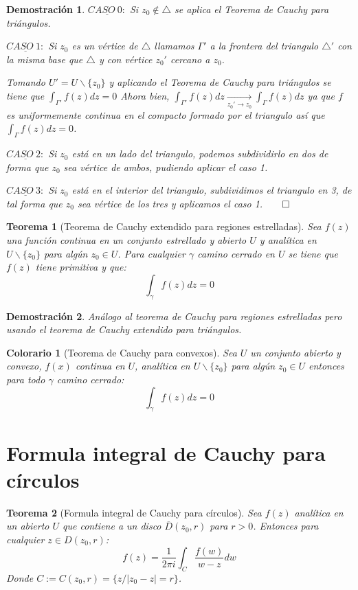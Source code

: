 \documentclass[12pt]{book}
\newtheorem{theorem}{Teorema}[chapter]
\newtheorem*{dem}{Demostración}
\newtheorem{col}{Colorario}[chapter]
\begin{document}
\begin{dem}
$\underline{CASO\ 0:}$
Si $z_0\notin \triangle$ se aplica el Teorema de Cauchy para triángulos.

$\underline{CASO\ 1:}$
Si $z_0$ es un vértice de $\triangle$ llamamos $\Gamma'$ a la frontera del triangulo $\triangle'$ con la misma base que $\triangle$ y con vértice $z_0'$ cercano a $z_0$.

Tomando $U' = U\backslash \{z_0\}$ y aplicando el Teorema de Cauchy para triángulos se tiene que $\int_{\Gamma'} f(z)dz =0$ Ahora bien, $\int_{\Gamma'} f(z)dz \xrightarrow[z_0'\to z_0]{} \int_{\Gamma} f(z)dz$ ya que $f$ es uniformemente continua en el compacto formado por el triangulo así que  $\int_{\Gamma} f(z)dz=0$.

$\underline{CASO\ 2:}$
Si $z_0$ está en un lado del triangulo, podemos subdividirlo en dos de forma que $z_0$ sea vértice de ambos, pudiendo aplicar el caso 1.

$\underline{CASO\ 3:}$
Si $z_0$ está en el interior del triangulo, subdividimos el triangulo en 3, de tal forma que $z_0$ sea vértice de los tres y aplicamos el caso 1.$\qed$
\end{dem}


\begin{theorem}[Teorema de Cauchy extendido para regiones estrelladas]
Sea $f(z)$ una función continua en un conjunto estrellado y abierto $U$ y  analítica en $U\backslash \{z_0\}$ para algún $z_0 \in U$. Para cualquier $\gamma$ camino cerrado en $U$ se tiene que $f(z)$ tiene primitiva y que:
$$
\int_{\gamma} f(z)dz = 0
$$
\end{theorem}
\begin{dem}
Análogo al teorema de Cauchy para regiones estrelladas pero usando el teorema de Cauchy extendido para triángulos.
\end{dem}


\begin{col}[Teorema de Cauchy para convexos]
Sea $U$ un conjunto abierto y convexo, $f(x)$ continua en $U$, analítica en $U\backslash \{z_0\}$ para algún $z_0 \in U$ entonces para todo $\gamma$ camino cerrado:
$$
\int_{\gamma} f(z)dz = 0
$$
\end{col}

\section{Formula integral de Cauchy para círculos}


\begin{theorem}[Formula integral de Cauchy para círculos]
Sea $f(z)$ analítica en un abierto $U$ que contiene a un disco $\overline{D}(z_0,r)$ para $r>0$. Entonces para cualquier $z \in D(z_0,r)$:
$$
f(z) = \frac{1}{2\pi i}\int_C \frac{f(w)}{w-z}dw
$$
Donde $C:= C(z_0,r) = \{z/ |z_0-z|=r\}$.
\end{theorem}
\end{document}
